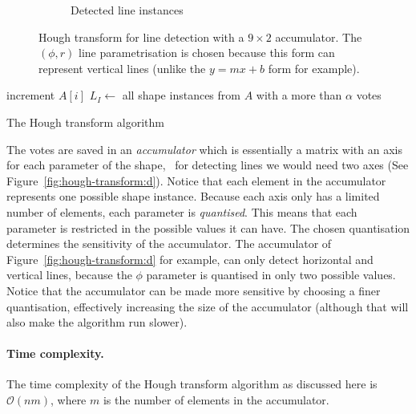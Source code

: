 \begin{figure}[htb]
\begin{subfigure}[b]{0.3\linewidth}
		\caption{Detected line instances}\label{fig:hough-transform:e}
	\end{subfigure}
	\caption{Hough transform for line detection with a $9\times2$ accumulator. The $(\phi,r)$ line parametrisation is chosen because this form can represent vertical lines (unlike the $y=mx+b$ form for example).}%
\label{fig:hough-transform}
\end{figure}
\begin{algorithm} 
	
	 {
		{
			increment $A[i]$\;
		}
	}
	$L_I \leftarrow$ all shape instances from $A$ with a more than $\alpha$ votes\;
	\caption{The Hough transform algorithm}%
\label{algo:hough-transform}
\end{algorithm}
The votes are saved in an \emph{accumulator} which is essentially a matrix with an axis for each parameter of the shape, \eg\ for detecting lines we would need two axes (See Figure~\ref{fig:hough-transform:d}).
Notice that each element in the accumulator represents one possible shape instance.
Because each axis only has a limited number of elements, each parameter is \emph{quantised}.
This means that each parameter is restricted in the possible values it can have.
The chosen quantisation determines the sensitivity of the accumulator.
The accumulator of Figure~\ref{fig:hough-transform:d} for example, can only detect horizontal and vertical lines, because the $\phi$ parameter is quantised in only two possible values.
Notice that the accumulator can be made more sensitive by choosing a finer quantisation, effectively increasing the size of the accumulator (although that will also make the algorithm run slower).

\paragraph{Time complexity.}  The time complexity of the Hough transform algorithm as discussed here is $\mathcal{O}(nm)$, where $m$ is the number of elements in the accumulator.

